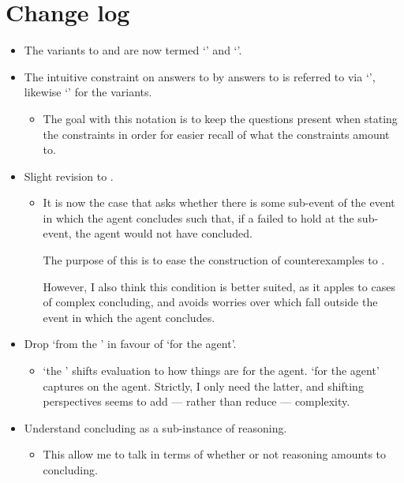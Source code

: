 \chapter*{Change log}
\label{cha:changes}


\begin{itemize}
\item
  The variants to \qWhy{} and \qHow{} are now termed `\qWhyV{}' and `\qHowV{}'.
\item
  The intuitive constraint on answers to \qWhy{} by answers to \qHow{} is referred to via `\issueInclusion{}', likewise `\issueConstraint{}' for the variants.
  \begin{itemize}
  \item
    The goal with this notation is to keep the questions present when stating the constraints in order for easier recall of what the constraints amount to.
  \end{itemize}
\item
  Slight revision to \qWhyV{}.
  \begin{itemize}
  \item
    It is now the case that \qWhyV{} asks whether there is some sub-event of the event in which the agent concludes such that, if a \ros{} failed to hold at the sub-event, the agent would not have concluded.

    The purpose of this is to ease the construction of counterexamples to \issueInclusion{}.

    However, I also think this condition is better suited, as it apples to cases of complex concluding, and avoids worries over  which fall outside the event in which the agent concludes.
  \end{itemize}
\item
  Drop `from the \agpe{}' in favour of `for the agent'.
  \begin{itemize}
  \item
    `the \agpe{}' shifts evaluation to how things are for the agent.
    `for the agent' captures  on the agent.
    Strictly, I only need the latter, and shifting perspectives seems to add --- rather than reduce --- complexity.
  \end{itemize}
\item
  Understand concluding as a sub-instance of reasoning.
  \begin{itemize}
  \item
    This allow me to talk in terms of whether or not reasoning amounts to concluding.
  \end{itemize}
\end{itemize}

